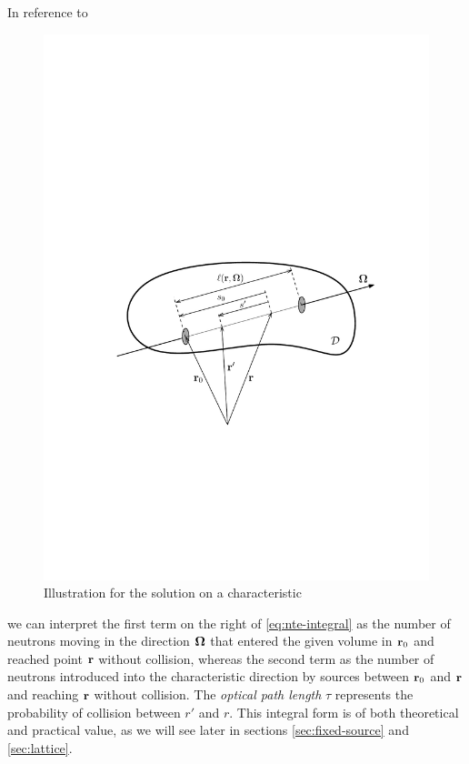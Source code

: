 In reference to 
\begin{figure}[htp]
\begin{center}
  \includegraphics[scale=.75]{trepka}
  \caption{Illustration for the solution on a characteristic}
  \label{fig:trepka}
\end{center}
\end{figure}
we can interpret the first term on the right of \eqref{eq:nte-integral} as the number of
neutrons moving in the direction $\mathbf{\Omega}$ that entered the given volume in $\mathbf{r}_0$ and reached point $\mathbf{r}$ without
collision, whereas the second term as the number of neutrons introduced into the characteristic direction by sources 
between $\mathbf{r}_0$ and $\mathbf{r}$ and reaching $\mathbf{r}$ without collision. The \textit{optical path length} $\tau$ represents the 
probability of collision between $r'$ and $r$. This integral form is of both theoretical and practical value, as we will
see later in sections \ref{sec:fixed-source} and \ref{sec:lattice}.

